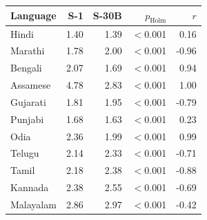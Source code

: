 \begin{tabular}{@{}lrrrr@{}}
\toprule
Language & S-1 & S-30B & $p_{\mathrm{Holm}}$ & $r$ \\
\midrule
Hindi & 1.40 & 1.39 & $<$0.001 & 0.16 \\
Marathi & 1.78 & 2.00 & $<$0.001 & -0.96 \\
Bengali & 2.07 & 1.69 & $<$0.001 & 0.94 \\
Assamese & 4.78 & 2.83 & $<$0.001 & 1.00 \\
Gujarati & 1.81 & 1.95 & $<$0.001 & -0.79 \\
Punjabi & 1.68 & 1.63 & $<$0.001 & 0.23 \\
Odia & 2.36 & 1.99 & $<$0.001 & 0.99 \\
Telugu & 2.14 & 2.33 & $<$0.001 & -0.71 \\
Tamil & 2.18 & 2.38 & $<$0.001 & -0.88 \\
Kannada & 2.38 & 2.55 & $<$0.001 & -0.69 \\
Malayalam & 2.86 & 2.97 & $<$0.001 & -0.42 \\
\bottomrule
\end{tabular}
